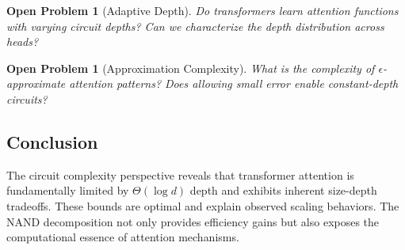 \documentclass[11pt]{article}
\newtheorem{problem}[theorem]{Open Problem}
\theoremstyle{definition}
\begin{document}
\begin{problem}[Adaptive Depth]






Do transformers learn attention functions with varying circuit depths? Can we characterize the depth distribution across heads?






\end{problem}













\begin{problem}[Approximation Complexity]






What is the complexity of $\epsilon$-approximate attention patterns? Does allowing small error enable constant-depth circuits?






\end{problem}













\subsection{Conclusion}













The circuit complexity perspective reveals that transformer attention is fundamentally limited by $\Theta(\log d)$ depth and exhibits inherent size-depth tradeoffs. These bounds are optimal and explain observed scaling behaviors. The NAND decomposition not only provides efficiency gains but also exposes the computational essence of attention mechanisms.
\end{document}
